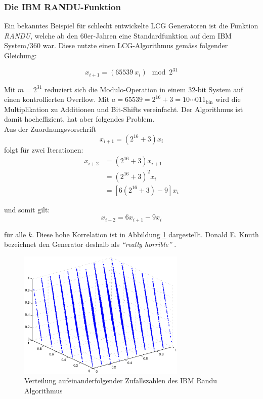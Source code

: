 \documentclass{book}
\begin{document}
\begin{refsection}
\subsubsection{Die IBM RANDU-Funktion}
Ein bekanntes Beispiel für schlecht entwickelte LCG Generatoren ist die Funktion \textit{RANDU}, welche ab den 60er-Jahren eine Standardfunktion auf dem IBM System/360 war. Diese nutzte einen LCG-Algorithmus gemäss folgender Gleichung:

\begin{equation}
	x_{i+1} = \left( 65539 \: x_i \right) \mod{2^{31}}
	\label{equ:ibm_randu}
\end{equation}

Mit $m = 2^{31}$ reduziert sich die Modulo-Operation in einem 32-bit System auf einen kontrollierten Overflow. Mit $a = 65539 = 2^{16} + 3 = 10\cdots011_{\text{bin}}$ wird die Multiplikation zu Additionen und Bit-Shifts vereinfacht. Der Algorithmus ist damit hocheffizient, hat aber folgendes Problem. \\

Aus der Zuordnungsvorschrift
\begin{equation*}
	x_{i+1} = (2^{16} + 3) x_i
\end{equation*}
folgt für zwei Iterationen:
\begin{align*}
	x_{i+2} &= (2^{16} + 3) x_{i+1} \\
	 &= (2^{16} + 3)^2 x_i \\
	 &= [6 (2^{16} + 3) - 9] x_i
\end{align*}

und somit gilt:
\begin{equation}
	x_{i+2} = 6 x_{i+1} - 9 x_i
\end{equation}

für alle $k$. Diese hohe Korrelation ist in Abbildung \ref{fig:IBMRandu} dargestellt. Donald E. Knuth bezeichnet den Generator deshalb als \textit{``really horrible''} \cite[p.173]{rng:KnuthVol2}. \\

\begin{figure}[htbp]
	\centering
	\includegraphics[width=8cm]{images/ibm_randu.eps}
	\caption{Verteilung aufeinanderfolgender Zufallszahlen des IBM Randu Algorithmus}
	\label{fig:IBMRandu}
\end{figure}



\end{refsection}
\end{document}
